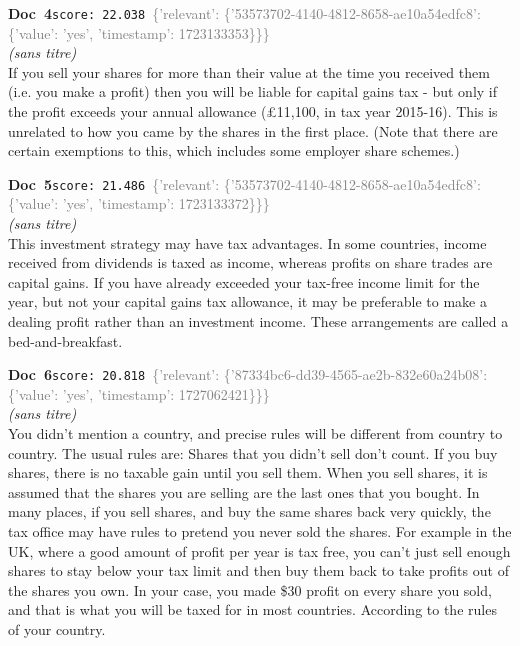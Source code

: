 \documentclass[a4paper,11pt]{article}
\begin{document}
\begin{docenv}
{\footnotesize\textcolor{doccolor}{\textbf{Doc~4}}}\hfill{\tiny\texttt{score:~22.038}}\ {\tiny\textcolor{gray}{\{'relevant': \{'53573702-4140-4812-8658-ae10a54edfc8': \{'value': 'yes', 'timestamp': 1723133353\}\}\}}}\\[3pt]
{\small\textit{(sans titre)}}\\[2pt]
\vspace{2pt}
{\footnotesize 
If you sell your shares for more than their value at the time you received them (i.e. you make a profit) then you will be liable for capital gains tax - but only if the profit exceeds your annual allowance (£11,100, in tax year 2015-16). This is unrelated to how you came by the shares in the first place. (Note that there are certain exemptions to this, which includes some employer share schemes.)}
\end{docenv}
\begin{docenv}
{\footnotesize\textcolor{doccolor}{\textbf{Doc~5}}}\hfill{\tiny\texttt{score:~21.486}}\ {\tiny\textcolor{gray}{\{'relevant': \{'53573702-4140-4812-8658-ae10a54edfc8': \{'value': 'yes', 'timestamp': 1723133372\}\}\}}}\\[3pt]
{\small\textit{(sans titre)}}\\[2pt]
\vspace{2pt}
{\footnotesize 
This investment strategy may have tax advantages. In some countries, income received from dividends is taxed as income, whereas profits on share trades are capital gains. If you have already exceeded your tax-free income limit for the year, but not your capital gains tax allowance, it may be preferable to make a dealing profit rather than an investment income. These arrangements are called a bed-and-breakfast.}
\end{docenv}
\begin{docenv}
{\footnotesize\textcolor{doccolor}{\textbf{Doc~6}}}\hfill{\tiny\texttt{score:~20.818}}\ {\tiny\textcolor{gray}{\{'relevant': \{'87334bc6-dd39-4565-ae2b-832e60a24b08': \{'value': 'yes', 'timestamp': 1727062421\}\}\}}}\\[3pt]
{\small\textit{(sans titre)}}\\[2pt]
\vspace{2pt}
{\footnotesize 
You didn't mention a country, and precise rules will be different from country to country. The usual rules are:  Shares that you didn't sell don't count. If you buy shares, there is no taxable gain until you sell them.  When you sell shares, it is assumed that the shares you are selling are the last ones that you bought.  In many places, if you sell shares, and buy the same shares back very quickly, the tax office may have rules to pretend you never sold the shares. For example in the UK, where a good amount of profit per year is tax free, you can't just sell enough shares to stay below your tax limit and then buy them back to take profits out of the shares you own.  In your case, you made \$30 profit on every share you sold, and that is what you will be taxed for in most countries. According to the rules of your country.}
\end{docenv}
\end{document}
